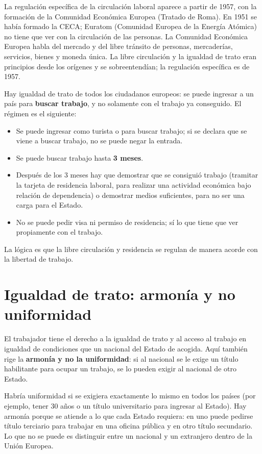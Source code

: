 \documentclass[12pt,oneside]{book}
\begin{document}
La regulación específica de la circulación laboral aparece a partir de 1957, con la formación de la Comunidad Económica Europea (Tratado de Roma). En 1951 se había formado la CECA; Euratom (Comunidad Europea de la Energía Atómica) no tiene que ver con la circulación de las personas. La Comunidad Económica Europea habla del mercado y del libre tránsito de personas, mercaderías, servicios, bienes y moneda única. La libre circulación y la igualdad de trato eran principios desde los orígenes y se sobreentendían; la regulación específica es de 1957.

Hay igualdad de trato de todos los ciudadanos europeos: se puede ingresar a un país para \textbf{buscar trabajo}, y no solamente con el trabajo ya conseguido. El régimen es el siguiente:
\begin{itemize}
    \item Se puede ingresar como turista o para buscar trabajo; si se declara que se viene a buscar trabajo, no se puede negar la entrada.
    \item Se puede buscar trabajo hasta \textbf{3 meses}.
    \item Después de los 3 meses hay que demostrar que se consiguió trabajo (tramitar la tarjeta de residencia laboral, para realizar una actividad económica bajo relación de dependencia) o demostrar medios suficientes, para no ser una carga para el Estado.
    \item No se puede pedir visa ni permiso de residencia; sí lo que tiene que ver propiamente con el trabajo.
\end{itemize}

La lógica es que la libre circulación y residencia se regulan de manera acorde con la libertad de trabajo.

\section{Igualdad de trato: armonía y no uniformidad}

El trabajador tiene el derecho a la igualdad de trato y al acceso al trabajo en igualdad de condiciones que un nacional del Estado de acogida. Aquí también rige la \textbf{armonía y no la uniformidad}: si al nacional se le exige un título habilitante para ocupar un trabajo, se lo pueden exigir al nacional de otro Estado.

Habría uniformidad si se exigiera exactamente lo mismo en todos los países (por ejemplo, tener 30 años o un título universitario para ingresar al Estado). Hay armonía porque se atiende a lo que cada Estado requiera: en uno puede pedirse título terciario para trabajar en una oficina pública y en otro título secundario. Lo que no se puede es distinguir entre un nacional y un extranjero dentro de la Unión Europea.
\end{document}
